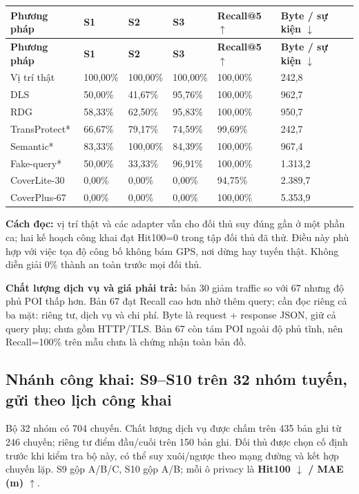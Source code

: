 \documentclass[10pt,a4paper]{article}
\begin{document}
\begingroup\small
\begin{longtable}{@{}P{3.425cm}P{1.998cm}P{1.998cm}P{1.998cm}P{2.854cm}P{3.520cm}@{}}
\toprule
\textbf{Phương pháp} & \textbf{S1} & \textbf{S2} & \textbf{S3} & \textbf{Recall@5 $\uparrow$} & \textbf{Byte / sự kiện $\downarrow$}\\\midrule
\endfirsthead
\toprule
\textbf{Phương pháp} & \textbf{S1} & \textbf{S2} & \textbf{S3} & \textbf{Recall@5 $\uparrow$} & \textbf{Byte / sự kiện $\downarrow$}\\\midrule
\endhead
\bottomrule\endfoot
Vị trí thật & 100,00\% & 100,00\% & 100,00\% & 100,00\% & 242,8\\
\addlinespace[3pt]
DLS & 50,00\% & 41,67\% & 95,76\% & 100,00\% & 962,7\\
\addlinespace[3pt]
RDG & 58,33\% & 62,50\% & 95,83\% & 100,00\% & 950,7\\
\addlinespace[3pt]
TransProtect* & 66,67\% & 79,17\% & 74,59\% & 99,69\% & 242,7\\
\addlinespace[3pt]
Semantic* & 83,33\% & 100,00\% & 84,39\% & 100,00\% & 967,4\\
\addlinespace[3pt]
Fake-query* & 50,00\% & 33,33\% & 96,91\% & 100,00\% & 1.313,2\\
\addlinespace[3pt]
CoverLite-30 & 0,00\% & 0,00\% & 0,00\% & 94,75\% & 2.389,7\\
\addlinespace[3pt]
CoverPlus-67 & 0,00\% & 0,00\% & 0,00\% & 100,00\% & 5.353,9\\
\end{longtable}
\endgroup
\textbf{Cách đọc:} vị trí thật và các adapter vẫn cho đối thủ suy đúng gần ở một phần ca; hai kế hoạch công khai đạt Hit100=0 trong tập đối thủ đã thử. Điều này phù hợp với việc tọa độ công bố không bám GPS, nơi dừng hay tuyến thật. Không diễn giải 0\% thành an toàn trước mọi đối thủ.

\textbf{Chất lượng dịch vụ và giá phải trả:} bản 30 giảm traffic so với 67 nhưng độ phủ POI thấp hơn. Bản 67 đạt Recall cao hơn nhờ thêm query; cần đọc riêng cả ba mặt: riêng tư, dịch vụ và chi phí. Byte là request + response JSON, giữ cả query phụ; chưa gồm HTTP/TLS. Bản 67 còn tám POI ngoài độ phủ tĩnh, nên Recall=100\% trên mẫu chưa là chứng nhận toàn bản đồ.


\clearpage
\subsection{Nhánh công khai: S9–S10 trên 32 nhóm tuyến, gửi theo lịch công khai}\label{sub:3.2}
Bộ 32 nhóm có 704 chuyến. Chất lượng dịch vụ được chấm trên 435 bản ghi từ 246 chuyến; riêng tư điểm đầu/cuối trên 150 bản ghi. Đối thủ được chọn cố định trước khi kiểm tra bộ này, có thể suy xuôi/ngược theo mạng đường và kết hợp chuyến lặp. S9 gộp A/B/C, S10 gộp A/B; mỗi ô privacy là \textbf{Hit100 $\downarrow$ / MAE (m) $\uparrow$}.
\end{document}
